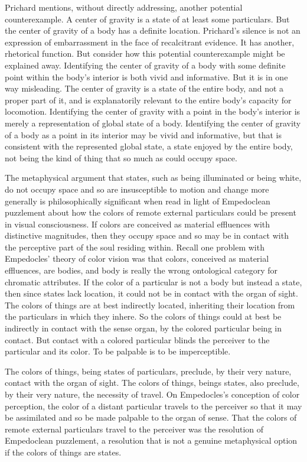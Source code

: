 Prichard mentions, without directly addressing, another potential counterexample. A center of gravity is a state of at least some particulars. But the center of gravity of a body has a definite location. Prichard's silence is not an expression of embarrassment in the face of recalcitrant evidence. It has another, rhetorical function. But consider how this potential counterexample might be explained away. Identifying the center of gravity of a body with some definite point within the body's interior is both vivid and informative. But it is in one way misleading. The center of gravity is a state of the entire body, and not a proper part of it, and is explanatorily relevant to the entire body's capacity for locomotion. Identifying the center of gravity with a point in the body's interior is merely a representation of global state of a body. Identifying the center of gravity of a body as a point in its interior may be vivid and informative, but that is consistent with the represented global state, a state enjoyed by the entire body, not being the kind of thing that so much as could occupy space.

The metaphysical argument that states, such as being illuminated or being white, do not occupy space and so are insusceptible to motion and change more generally is philosophically significant when read in light of Empedoclean puzzlement about how the colors of remote external particulars could be present in visual consciousness. If colors are conceived as material effluences with distinctive magnitudes, then they occupy space and so may be in contact with the perceptive part of the soul residing within. Recall one problem with Empedocles' theory of color vision was that colors, conceived as material effluences, are bodies, and body is really the wrong ontological category for chromatic attributes. If the color of a particular is not a body but instead a state, then since states lack location, it could not be in contact with the organ of sight. The colors of things are at best indirectly located, inheriting their location from the particulars in which they inhere. So the colors of things could at best be indirectly in contact with the sense organ, by the colored particular being in contact. But contact with a colored particular blinds the perceiver to the particular and its color. To be palpable is to be imperceptible.

The colors of things, being states of particulars, preclude, by their very nature, contact with the organ of sight. The colors of things, beings states, also preclude, by their very nature, the necessity of travel. On Empedocles's conception of color perception, the color of a distant particular travels to the perceiver so that it may be assimilated and so be made palpable to the organ of sense. That the colors of remote external particulars travel to the perceiver was the resolution of Empedoclean puzzlement, a resolution that is not a genuine metaphysical option if the colors of things are states. 

